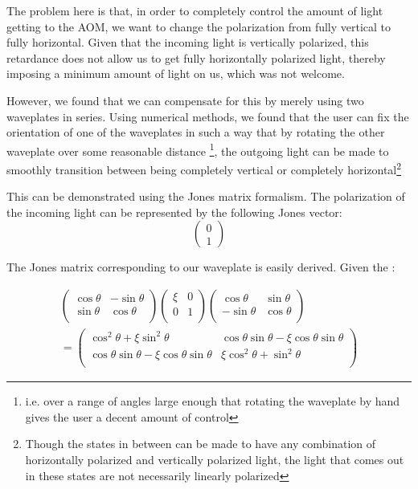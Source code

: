 The problem here is that, in order to completely control the amount of light getting to the AOM, we want to change the polarization from fully vertical to fully horizontal. Given that the incoming light is vertically polarized, this retardance does not allow us to get fully horizontally polarized light, thereby imposing a minimum amount of light on us, which was not welcome. 

However, we found that we can compensate for this by merely using two waveplates in series. Using numerical methods, we found that the user can fix the orientation of one of the waveplates in such a way that by rotating the other waveplate over some reasonable distance \footnote{i.e. over a range of angles large enough that rotating the waveplate by hand gives the user a decent amount of control}, the outgoing light can be made to smoothly transition between being completely vertical or completely horizontal\footnote{Though the states in between can be made to have any combination of horizontally polarized and vertically polarized light, the light that comes out in these states are not necessarily linearly polarized}

This can be demonstrated using the Jones matrix formalism. The polarization of the incoming light can be represented by the following Jones vector: 
\begin{equation}
\begin{pmatrix}
0\\1
\end{pmatrix}
\end{equation}

The Jones matrix corresponding to our waveplate is easily derived. Given the : 

\begin{multline}
\begin{pmatrix}
\cos\theta & - \sin \theta \\
\sin \theta & \cos\theta \\
\end{pmatrix}
\begin{pmatrix}
\xi & 0 \\
0 & 1 \\
\end{pmatrix}
\begin{pmatrix}
\cos\theta &  \sin \theta \\
-\sin \theta & \cos\theta \\
\end{pmatrix} \\
=
\begin{pmatrix}
\cos ^2 \theta+\xi \sin^2 \theta &  \cos\theta \sin \theta-\xi \cos\theta \sin \theta \\
\cos\theta \sin \theta-\xi \cos \theta \sin\theta & \xi \cos^2 \theta + \sin^2 \theta \\ \label{JonesMatrix001}
\end{pmatrix}
\end{multline}

